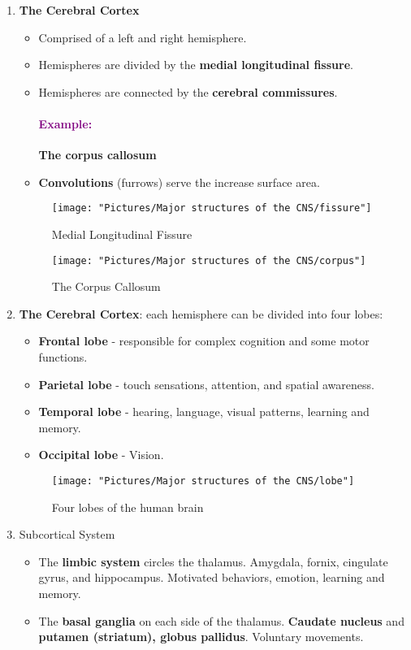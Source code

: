 \documentclass[12pt,a4paper]{article}
\newcommand{\example}[1]{\paragraph{\textcolor{purple}{Example:}} #1}
\begin{document}
	\begin{enumerate}
		\item \textbf{The Cerebral Cortex}
		\begin{itemize}
			\item Comprised of a left and right hemisphere. 
			\item Hemispheres are divided by the \textbf{medial longitudinal fissure}.
			\item Hemispheres are connected by the \textbf{cerebral commissures}.
			\example{\textbf{The corpus callosum}}
			\item \textbf{Convolutions} (furrows) serve the increase surface area. 
		\end{itemize}
		
		
\begin{figure}
	\centering
	\texttt{[image: "Pictures/Major structures of the CNS/fissure"]}
	\caption{Medial Longitudinal Fissure}
	\label{fig:fissure}
\end{figure}

\begin{figure}
	\centering
	\texttt{[image: "Pictures/Major structures of the CNS/corpus"]}
	\caption{The Corpus Callosum}
	\label{fig:corpus}
\end{figure}

		
		\item \textbf{The Cerebral Cortex}: each hemisphere can be divided into four lobes: 
		\begin{itemize}
			\item \textbf{Frontal lobe} - responsible for complex cognition and some motor functions. 
			\item \textbf{Parietal lobe} - touch sensations, attention, and spatial awareness. 
			\item \textbf{Temporal lobe} - hearing, language, visual patterns, learning and memory. 
			\item \textbf{Occipital lobe} - Vision. 
		\end{itemize}
		
		
\begin{figure}
	\centering
	\texttt{[image: "Pictures/Major structures of the CNS/lobe"]}
	\caption{Four lobes of the human brain}
	\label{fig:lobe}
\end{figure}
		
		\item Subcortical System 
		\begin{itemize}
			\item The \textbf{limbic system} circles the thalamus. 
			\subitem Amygdala, fornix, cingulate gyrus, and hippocampus. 
			\subitem Motivated behaviors, emotion, learning and memory. 
			\item The \textbf{basal ganglia} on each side of the thalamus. 
			\subitem \textbf{Caudate nucleus} and \textbf{putamen (striatum), globus pallidus}.
			\subitem Voluntary movements.
		\end{itemize}	
	\end{enumerate}
	
\end{document}
